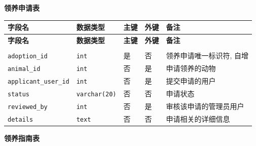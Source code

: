 \documentclass[12pt,a4paper,UTF8]{article}
\begin{document}
\vspace{0.25cm}

\noindent\textbf{领养申请表}

\begin{xltabular}{\linewidth}{|>{\raggedright\arraybackslash}p{4cm}|>{\raggedright\arraybackslash}p{3cm}|>{\raggedright\arraybackslash}p{1cm}|>{\raggedright\arraybackslash}p{1cm}|>{\raggedright\arraybackslash}p{5cm}|}
\hline
\textbf{字段名} & \textbf{数据类型} & \textbf{主键} & \textbf{外键} & \textbf{备注} \\ \hline
\endfirsthead

\hline
\textbf{字段名} & \textbf{数据类型} & \textbf{主键} & \textbf{外键} & \textbf{备注} \\ \hline
\endhead

\hline
{} \\
\endfoot

\hline 
\endlastfoot

\verb|adoption_id| & \verb|int| & 是 & 否 & 领养申请唯一标识符, 自增 \\ \hline
\verb|animal_id| & \verb|int| & 否 & 是 & 申请领养的动物 \\ \hline
\verb|applicant_user_id| & \verb|int| & 否 & 是 & 提交申请的用户 \\ \hline
\verb|status| & \verb|varchar(20)| & 否 & 否 & 申请状态\\ \hline
\verb|reviewed_by| & \verb|int| & 否 & 是 & 审核该申请的管理员用户\\ \hline
\verb|details| & \verb|text| & 否 & 否 & 申请相关的详细信息\\ \hline
\end{xltabular}

\vspace{0.25cm}

\noindent\textbf{领养指南表}
\end{document}

